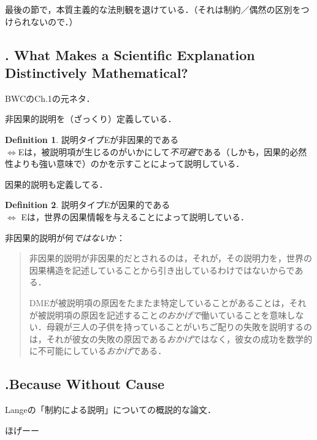 \documentclass[twoside,12pt,uplatex]{jsarticle}
\theoremstyle{definition}
\newtheorem{dfn}{Definition}
\begin{document}
最後の節で，本質主義的な法則観を退けている．（それは制約／偶然の区別をつけられないので．）

\subsection{\cite{Lange2013a}. What Makes a Scientific Explanation Distinctively Mathematical?}
BWCのCh.1の元ネタ．

非因果的説明を（ざっくり）定義している\citep[487,491]{Lange2013a}．
\begin{dfn}
    説明タイプEが非因果的である\\
    $\Longleftrightarrow$Eは，被説明項が生じるのがいかにして\emph{不可避}である（しかも，因果的必然性よりも強い意味で）のかを示すことによって説明している．
\end{dfn}
因果的説明も定義してる\citep[493]{Lange2013a}．
\begin{dfn}
    説明タイプEが因果的である\\
    $\Longleftrightarrow$ Eは，世界の因果情報を与えることによって説明している．
\end{dfn}

非因果的説明が何\emph{ではない}か：
\begin{quote}
非因果的説明が非因果的だとされるのは，それが，その説明力を，世界の因果構造を記述していることから引き出しているわけではないからである\citep[495]{Lange2013a}．

DMEが被説明項の原因をたまたま特定していることがあることは，それが被説明項の原因を記述すること\emph{のおかげで}働いていることを意味しない．母親が三人の子供を持っていることがいちご配りの失敗を説明するのは，それが彼女の失敗の原因である\emph{おかげ}ではなく，彼女の成功を数学的に不可能にしている\emph{おかげ}である\citep[496]{Lange2013a}．
\end{quote}

\subsection{\cite{Lange2018b}.Because Without Cause}
Langeの「制約による説明」についての概説的な論文．

ほげーー



\end{document}
